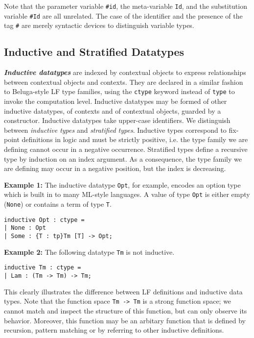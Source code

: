 \documentclass[11pt]{article}
\begin{document}
Note that the parameter variable \texttt{\#id}, the meta-variable \texttt{Id}, and the substitution variable \texttt{\#Id} are all unrelated. The case of the identifier and the presence of the tag \texttt{\#} are merely syntactic devices to distinguish variable types.

\subsection{Inductive and Stratified Datatypes}
\textbf{\textit{Inductive datatypes}} are indexed by contextual
objects to express relationships between contextual objects and
contexts. They are declared in a similar fashion to Beluga-style LF
type families, using the \texttt{ctype} keyword instead of
\texttt{type} to invoke the computation level. Inductive datatypes may
be formed of other inductive datatypes, of contexts and of contextual
objects, guarded by a constructor. Inductive datatypes take upper-case
identifiers. We distinguish between \textit{inductive types} and
\textit{stratified types}. Inductive types correspond to fix-point
definitions in logic and must be strictly positive, i.e. the type
family we are defining cannot occur in a negative
occurrence. Stratified types define a recursive type by induction on
an index argument. As a consequence, the type family we are defining
may occur in a negative position, but the index is decreasing.


\textbf{Example 1:} The inductive datatype \texttt{Opt}, for example, encodes an option type which is built in to many ML-style languages. A value of type \texttt{Opt} is either empty (\texttt{None}) or contains a term of type \texttt{T}.
\begin{verbatim}
inductive Opt : ctype =
| None : Opt
| Some : {T : tp}Tm [T] -> Opt;
\end{verbatim}

\textbf{Example 2:} The following datatype \texttt{Tm} is not inductive.
\begin{verbatim}
inductive Tm : ctype =
| Lam : (Tm -> Tm) -> Tm;
\end{verbatim}

This clearly illustrates the difference between LF definitions and
inductive data types. Note that the function space \verb+Tm -> Tm+
is a strong function space; we cannot match and inspect the structure
of this function, but can only observe its behavior. Moreover, this
function may be an arbitary function that is defined by recursion,
pattern matching or by referring to other inductive definitions. 
\end{document}
